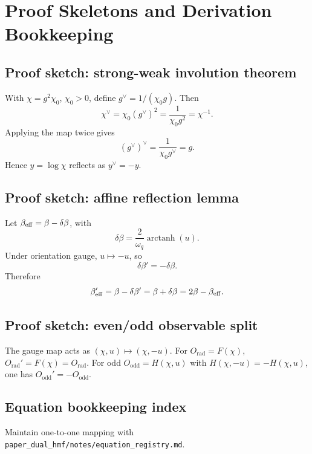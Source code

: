 \section{Proof Skeletons and Derivation Bookkeeping}
\label{sec:appendix_proofs}

\subsection{Proof sketch: strong-weak involution theorem}
With \(\chi=g^2\chi_0\), \(\chi_0>0\), define \(g^\vee=1/(\chi_0 g)\). Then
\begin{equation}
  \chi^\vee=\chi_0(g^\vee)^2=\frac{1}{\chi_0 g^2}=\chi^{-1}.
\end{equation}
Applying the map twice gives
\begin{equation}
  (g^\vee)^\vee=\frac{1}{\chi_0 g^\vee}=g.
\end{equation}
Hence \(y=\log\chi\) reflects as \(y^\vee=-y\).

\subsection{Proof sketch: affine reflection lemma}
Let \(\beta_{\mathrm{eff}}=\beta-\delta\beta\), with
\begin{equation}
  \delta\beta=\frac{2}{\omega_q}\operatorname{arctanh}(u).
\end{equation}
Under orientation gauge, \(u\mapsto -u\), so
\begin{equation}
  \delta\beta'=-\delta\beta.
\end{equation}
Therefore
\begin{equation}
  \beta_{\mathrm{eff}}'=\beta-\delta\beta'=\beta+\delta\beta=2\beta-\beta_{\mathrm{eff}}.
\end{equation}

\subsection{Proof sketch: even/odd observable split}
The gauge map acts as \((\chi,u)\mapsto(\chi,-u)\). For \(O_{\mathrm{rad}}=F(\chi)\),
\(O_{\mathrm{rad}}'=F(\chi)=O_{\mathrm{rad}}\). For odd \(O_{\mathrm{odd}}=H(\chi,u)\) with
\(H(\chi,-u)=-H(\chi,u)\), one has \(O_{\mathrm{odd}}'=-O_{\mathrm{odd}}\).

\subsection{Equation bookkeeping index}
Maintain one-to-one mapping with \texttt{paper\_dual\_hmf/notes/equation\_registry.md}.
